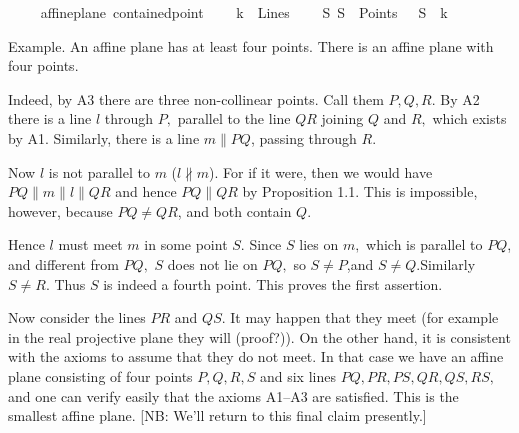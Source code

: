 \begin{isabellebody}
%
\isadelimproof
\ \ %
\endisadelimproof
%
\isatagproof
{}\isamarkupfalse%
%
\endisatagproof
{\isafoldproof}%
%
\isadelimproof
\isanewline
%
\endisadelimproof
\isanewline
{}\isamarkupfalse%
\ {\isacharparenleft}{\kern0pt}\ affine{\isacharunderscore}{\kern0pt}plane{\isacharparenright}{\kern0pt}\ contained{\isacharunderscore}{\kern0pt}point{\isacharcolon}{\kern0pt}\ \isanewline
\ \ \ {\isachardoublequoteopen}k\ {\isasymin}\ Lines{\isachardoublequoteclose}\isanewline
\ \ \ {\isachardoublequoteopen}{\isasymexists}\ S{\isachardot}{\kern0pt}\ S\ {\isasymin}\ Points\ {\isasymand}\ \ S\ {\isasymlhd}\ k{\isachardoublequoteclose}\isanewline
%
\isadelimproof
\ \ %
\endisadelimproof
%
\isatagproof
{}\isamarkupfalse%
%
\endisatagproof
{\isafoldproof}%
%
\isadelimproof
%
\endisadelimproof
%
\begin{isamarkuptext}%
\begin{hartshorne}
Example. An affine plane has at least four points. There is an affine plane with four points.

Indeed, by A3 there are three non-collinear points. Call them $P, Q, R.$ By A2 there is a line 
$l$ through $P,$ parallel to the line $QR$ joining $Q$ and $R,$ which exists by A1. 
Similarly, there is a line $m \parallel  PQ$, passing through $R.$

Now $l$ is not parallel to $m$ ($l \nparallel m$). For if it were, then we would have 
$PQ \parallel m \parallel l \parallel QR$
and hence $PQ \parallel QR$ by Proposition 1.1. This is impossible, however, because $P Q \ne QR$, 
and both contain $Q.$

Hence $l$ must meet $m$ in some point $S.$ Since $S$ lies on $m,$ which is parallel to $PQ$, and 
different from $PQ,$ $S$ does not lie on $PQ,$ so $S\ne P$,and $S \ne Q$.Similarly $S \ne R$. Thus
$S$ is indeed a fourth point. This proves the first assertion.

Now consider the lines $PR$ and $QS$. It
may happen that they meet (for example in the real projective plane they will (proof?)). 
On the other hand, it is consistent with the axioms to assume that they do not meet.
In that case we have an affine plane consisting of four points $P, Q, R, S$ and six lines 
$PQ, PR, PS, QR, QS, RS,$ and one can verify easily that the axioms A1–A3 are satisfied. 
This is the smallest affine plane. [NB: We'll return to this final claim presently.]


\end{hartshorne}
\end{isamarkuptext}
\end{isabellebody}
